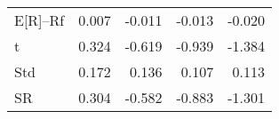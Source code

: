 \begin{tabular}{lrrrr}
\toprule
\midrule
E[R]--Rf & 0.007 & -0.011 & -0.013 & -0.020 \\
t & 0.324 & -0.619 & -0.939 & -1.384 \\
Std & 0.172 & 0.136 & 0.107 & 0.113 \\
SR & 0.304 & -0.582 & -0.883 & -1.301 \\
\bottomrule
\end{tabular}
